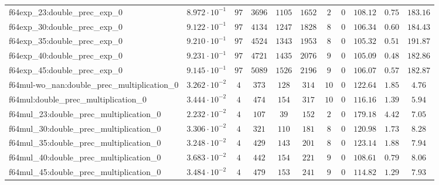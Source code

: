 \begin{tabular}{|l|c|c|c|c|c|c|c|c|c|c|}
f64exp\_23:double\_prec\_exp\_0                & $ 8.972 \cdot 10^{-1} $ & $ 97     $ & $ 3696   $ & $ 1105  $ & $ 1652  $ & $ 2   $ & $ 0 $ & $ 108.12      $ & $ 0.75    $ & $ 183.16  $ \\
f64exp\_30:double\_prec\_exp\_0                & $ 9.122 \cdot 10^{-1} $ & $ 97     $ & $ 4134   $ & $ 1247  $ & $ 1828  $ & $ 8   $ & $ 0 $ & $ 106.34      $ & $ 0.60    $ & $ 184.43  $ \\
f64exp\_35:double\_prec\_exp\_0                & $ 9.210 \cdot 10^{-1} $ & $ 97     $ & $ 4524   $ & $ 1343  $ & $ 1953  $ & $ 8   $ & $ 0 $ & $ 105.32      $ & $ 0.51    $ & $ 191.87  $ \\
f64exp\_40:double\_prec\_exp\_0                & $ 9.231 \cdot 10^{-1} $ & $ 97     $ & $ 4721   $ & $ 1435  $ & $ 2076  $ & $ 9   $ & $ 0 $ & $ 105.09      $ & $ 0.48    $ & $ 182.86  $ \\
f64exp\_45:double\_prec\_exp\_0                & $ 9.145 \cdot 10^{-1} $ & $ 97     $ & $ 5089   $ & $ 1526  $ & $ 2196  $ & $ 9   $ & $ 0 $ & $ 106.07      $ & $ 0.57    $ & $ 182.87  $ \\
f64mul-wo\_nan:double\_prec\_multiplication\_0 & $ 3.262 \cdot 10^{-2} $ & $ 4      $ & $ 373    $ & $ 128   $ & $ 314   $ & $ 10  $ & $ 0 $ & $ 122.64      $ & $ 1.85    $ & $ 4.76    $ \\
f64mul:double\_prec\_multiplication\_0         & $ 3.444 \cdot 10^{-2} $ & $ 4      $ & $ 474    $ & $ 154   $ & $ 317   $ & $ 10  $ & $ 0 $ & $ 116.16      $ & $ 1.39    $ & $ 5.94    $ \\
f64mul\_23:double\_prec\_multiplication\_0     & $ 2.232 \cdot 10^{-2} $ & $ 4      $ & $ 107    $ & $ 39    $ & $ 152   $ & $ 2   $ & $ 0 $ & $ 179.18      $ & $ 4.42    $ & $ 7.05    $ \\
f64mul\_30:double\_prec\_multiplication\_0     & $ 3.306 \cdot 10^{-2} $ & $ 4      $ & $ 321    $ & $ 110   $ & $ 181   $ & $ 8   $ & $ 0 $ & $ 120.98      $ & $ 1.73    $ & $ 8.28    $ \\
f64mul\_35:double\_prec\_multiplication\_0     & $ 3.248 \cdot 10^{-2} $ & $ 4      $ & $ 429    $ & $ 143   $ & $ 201   $ & $ 8   $ & $ 0 $ & $ 123.14      $ & $ 1.88    $ & $ 7.94    $ \\
f64mul\_40:double\_prec\_multiplication\_0     & $ 3.683 \cdot 10^{-2} $ & $ 4      $ & $ 442    $ & $ 154   $ & $ 221   $ & $ 9   $ & $ 0 $ & $ 108.61      $ & $ 0.79    $ & $ 8.06    $ \\
f64mul\_45:double\_prec\_multiplication\_0     & $ 3.484 \cdot 10^{-2} $ & $ 4      $ & $ 479    $ & $ 153   $ & $ 241   $ & $ 9   $ & $ 0 $ & $ 114.82      $ & $ 1.29    $ & $ 7.93    $ \\

\end{tabular}
